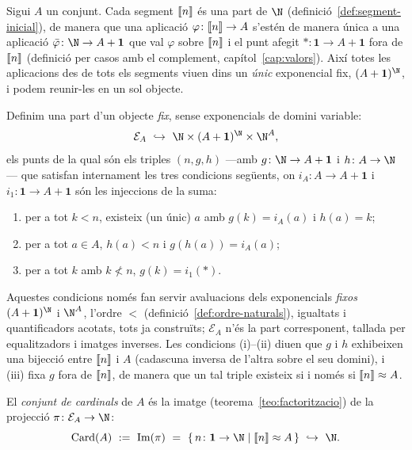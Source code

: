 \begin{definicio}\label{def:card-A}
Sigui \(A\) un conjunt. Cada segment \(\llbracket n\rrbracket\) és una part de \(\N\)
(definició~\ref{def:segment-inicial}), de manera que una aplicació
\(\varphi\colon\llbracket n\rrbracket\to A\) s'estén de manera única a una aplicació
\(\bar\varphi\colon\N\to A+\mathbf1\) que val \(\varphi\) sobre \(\llbracket n\rrbracket\)
i el punt afegit \(\ast\colon\mathbf1\to A+\mathbf1\) fora de \(\llbracket n\rrbracket\)
(definició per casos amb el complement, capítol~\ref{cap:valors}). Així
totes les aplicacions des de tots els segments viuen dins un \emph{únic}
exponencial fix, \((A+\mathbf1)^{\N}\), i podem reunir-les en un sol
objecte.

Definim una part d'un objecte \emph{fix}, sense exponencials de domini
variable:
\[
\mathcal E_A\ \hookrightarrow\ \N\times(A+\mathbf1)^{\N}\times\N^{A},
\]
els punts de la qual són els triples \((n,g,h)\) ---amb
\(g\colon\N\to A+\mathbf1\) i \(h\colon A\to\N\)--- que satisfan
internament les tres condicions següents, on \(i_A\colon A\to A+\mathbf1\)
i \(i_1\colon\mathbf1\to A+\mathbf1\) són les injeccions de la suma:
\begin{enumerate}
\item[(i)] per a tot \(k<n\), existeix (un únic) \(a\) amb \(g(k)=i_A(a)\)
i \(h(a)=k\);
\item[(ii)] per a tot \(a\in A\), \(h(a)<n\) i \(g(h(a))=i_A(a)\);
\item[(iii)] per a tot \(k\) amb \(k\not<n\), \(g(k)=i_1(\ast)\).
\end{enumerate}
Aquestes condicions només fan servir avaluacions dels exponencials
\emph{fixos} \((A+\mathbf1)^{\N}\) i \(\N^{A}\), l'ordre \(<\)
(definició~\ref{def:ordre-naturals}), igualtats i quantificadors acotats,
tots ja construïts; \(\mathcal E_A\) n'és la part corresponent, tallada per
equalitzadors i imatges inverses. Les condicions (i)--(ii) diuen que
\(g\) i \(h\) exhibeixen una bijecció entre \(\llbracket n\rrbracket\) i \(A\) (cadascuna
inversa de l'altra sobre el seu domini), i (iii) fixa \(g\) fora de
\(\llbracket n\rrbracket\), de manera que un tal triple existeix si i només si
\(\llbracket n\rrbracket\approx A\).

El \emph{conjunt de cardinals} de \(A\) és la imatge
(teorema~\ref{teo:factoritzacio}) de la projecció
\(\pi\colon\mathcal E_A\to\N\):
\[
\operatorname{Card}(A)\ :=\ \operatorname{Im}(\pi)\ =\
\{\,n\colon\mathbf1\to\N \mid \seg{n}\approx A\,\}
\ \hookrightarrow\ \N .
\]
\end{definicio}

